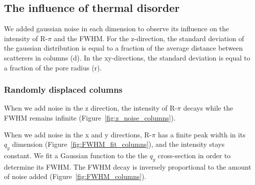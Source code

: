 \documentclass{article}
\begin{document}
  \subsection{The influence of thermal disorder}

  We added gaussian noise in each dimension to observe its influence on the intensity
  of R-$\pi$ and the FWHM. For the z-direction, the standard deviation of the 
  gaussian distribution is equal to a fraction of the average distance between scatterers
  in columns (d). In the xy-directions, the standard deviation is equal to a fraction 
  of the pore radius (r).

  \subsubsection{Randomly displaced columns}

  When we add noise in the z direction, the intensity of R-$\pi$ decays while the
  FWHM remains infinite (Figure~\ref{fig:z_noise_columns}).

  When we add noise in the x and y directions, R-$\pi$ has a finite peak width
  in its $q_y$ dimension (Figure~\ref{fig:FWHM_fit_columns}), and the intensity
  stays constant. We fit a Gaussian function to the the $q_y$ cross-section in
  order to determine its FWHM. The FWHM decay is inversely proportional to the
  amount of noise added (Figure~\ref{fig:FWHM_columns}). 
\end{document}
